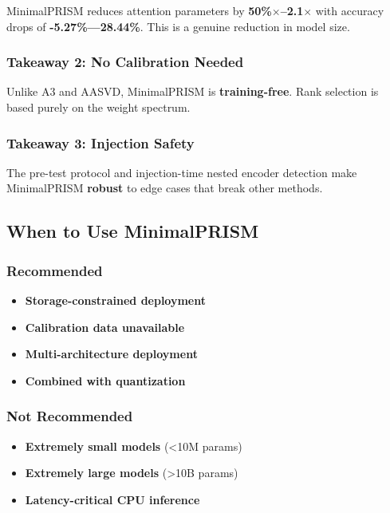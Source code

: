 MinimalPRISM reduces attention parameters by \textbf{50\%$\times$--2.1$\times$} 
with accuracy drops of \textbf{-5.27\%---28.44\%}. This is a genuine 
reduction in model size.

\subsubsection{Takeaway 2: No Calibration Needed}

Unlike A3 and AASVD, MinimalPRISM is \textbf{training-free}. Rank selection is 
based purely on the weight spectrum.

\subsubsection{Takeaway 3: Injection Safety}

The pre-test protocol and injection-time nested encoder detection make 
MinimalPRISM \textbf{robust} to edge cases that break other methods.

\subsection{When to Use MinimalPRISM}

\subsubsection{Recommended}

\begin{itemize}
\item \textbf{Storage-constrained deployment}
\item \textbf{Calibration data unavailable}
\item \textbf{Multi-architecture deployment}
\item \textbf{Combined with quantization}

\end{itemize}
\subsubsection{Not Recommended}

\begin{itemize}
\item \textbf{Extremely small models} (<10M params)
\item \textbf{Extremely large models} (>10B params)
\item \textbf{Latency-critical CPU inference}

\end{itemize}
